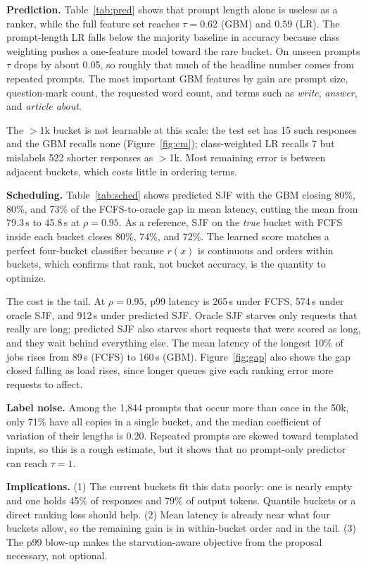 \documentclass[10pt,twocolumn]{article}
\begin{document}
\textbf{Prediction.} Table~\ref{tab:pred} shows that prompt length alone is useless as a ranker, while the full feature set reaches $\tau = 0.62$ (GBM) and $0.59$ (LR). The prompt-length LR falls below the majority baseline in accuracy because class weighting pushes a one-feature model toward the rare bucket. On unseen prompts $\tau$ drops by about 0.05, so roughly that much of the headline number comes from repeated prompts. The most important GBM features by gain are prompt size, question-mark count, the requested word count, and terms such as \emph{write}, \emph{answer}, and \emph{article about}.

The $>$1k bucket is not learnable at this scale: the test set has 15 such responses and the GBM recalls none (Figure~\ref{fig:cm}); class-weighted LR recalls 7 but mislabels 522 shorter responses as $>$1k. Most remaining error is between adjacent buckets, which costs little in ordering terms.

\textbf{Scheduling.} Table~\ref{tab:sched} shows predicted SJF with the GBM closing 80\%, 80\%, and 73\% of the FCFS-to-oracle gap in mean latency, cutting the mean from 79.3\,s to 45.8\,s at $\rho = 0.95$. As a reference, SJF on the \emph{true} bucket with FCFS inside each bucket closes 80\%, 74\%, and 72\%. The learned score matches a perfect four-bucket classifier because $r(x)$ is continuous and orders within buckets, which confirms that rank, not bucket accuracy, is the quantity to optimize.

The cost is the tail. At $\rho = 0.95$, p99 latency is 265\,s under FCFS, 574\,s under oracle SJF, and 912\,s under predicted SJF. Oracle SJF starves only requests that really are long; predicted SJF also starves short requests that were scored as long, and they wait behind everything else. The mean latency of the longest 10\% of jobs rises from 89\,s (FCFS) to 160\,s (GBM). Figure~\ref{fig:gap} also shows the gap closed falling as load rises, since longer queues give each ranking error more requests to affect.

\textbf{Label noise.} Among the 1{,}844 prompts that occur more than once in the 50k, only 71\% have all copies in a single bucket, and the median coefficient of variation of their lengths is 0.20. Repeated prompts are skewed toward templated inputs, so this is a rough estimate, but it shows that no prompt-only predictor can reach $\tau = 1$.

\textbf{Implications.} (1) The current buckets fit this data poorly: one is nearly empty and one holds 45\% of responses and 79\% of output tokens. Quantile buckets or a direct ranking loss should help. (2) Mean latency is already near what four buckets allow, so the remaining gain is in within-bucket order and in the tail. (3) The p99 blow-up makes the starvation-aware objective from the proposal necessary, not optional.
\end{document}

